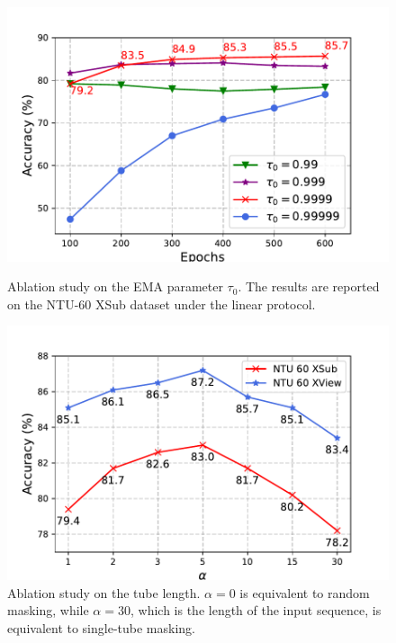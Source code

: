 \begin{figure}[htbp]
  \begin{minipage}[b]{0.49\linewidth}
    \centering
    \includegraphics[width=0.95\linewidth]{figures/ema_ablation.pdf}
    \caption{Ablation study on the EMA parameter $\tau_{0}$. The results are reported on the NTU-60 XSub dataset under the linear protocol.}
    \label{fig:ema_ablation}
  \end{minipage}
  \hfill
  \begin{minipage}[b]{0.49\linewidth}
    \centering
    \includegraphics[width=0.95\linewidth]{figures/alpha_ablation.pdf}
    \caption{Ablation study on the tube length. $\alpha=0$ is equivalent to random masking, while $\alpha=30$, which is the length of the input sequence, is equivalent to single-tube masking.}
    \label{fig:alpha_ablation}
  \end{minipage}
\end{figure}


